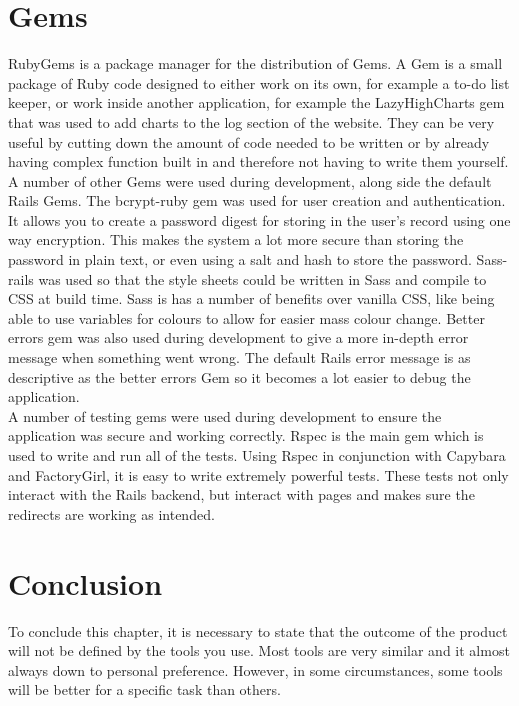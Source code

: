 \section{Gems}
RubyGems \citep{rubygems:2009} is a package manager for the distribution of Gems. A Gem is a small package of Ruby code designed to either work on its own, for example a to-do list keeper, or work inside another application, for example the LazyHighCharts gem that was used to add charts to the log section of the website. They can be very useful by cutting down the amount of code needed to be written or by already having complex function built in and therefore not having to write them yourself. A number of other Gems were used during development, along side the default Rails Gems. The bcrypt-ruby gem was used for user creation and authentication. It allows you to create a password digest for storing in the user's record using one way encryption. This makes the system a lot more secure than storing the password in plain text, or even using a salt and hash to store the password. Sass-rails was used so that the style sheets could be written in Sass and compile to CSS at build time. Sass is has a number of benefits over vanilla CSS, like being able to use variables for colours to allow for easier mass colour change. Better errors gem was also used during development to give a more in-depth error message when something went wrong. The default Rails error message is as descriptive as the better errors Gem so it becomes a lot easier to debug the application.\\
A number of testing gems were used during development to ensure the application was secure and working correctly. Rspec is the main gem which is used to write and run all of the tests. Using Rspec in conjunction with Capybara and FactoryGirl, it is easy to write extremely powerful tests. These tests not only interact with the Rails backend, but interact with pages and makes sure the redirects are working as intended.

\section{Conclusion}
To conclude this chapter, it is necessary to state that the outcome of the product will not be defined by the tools you use. Most tools are very similar and it almost always down to personal preference. However, in some circumstances, some tools will be better for a specific task than others.